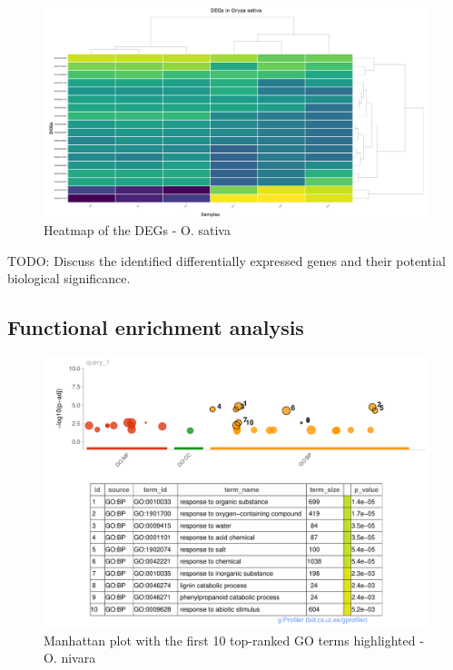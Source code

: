\begin{figure}[htbp]
    \caption{Heatmap of the DEGs - O. sativa}
    \label{fig:4.4-DEG-Heatmap-Oryza_sativa}
    \includegraphics[width=\textwidth]{../../results/plots-and-tables/4.4-DEG-Heatmap-Oryza_sativa}
\end{figure}



TODO: Discuss the identified differentially expressed genes and their potential biological significance.

\subsection{Functional enrichment analysis}



\begin{figure}[htbp]
    \caption{Manhattan plot with the first 10 top-ranked GO terms highlighted - O. nivara}
    \label{fig:5.2-Gost-Plot-Oryza_nivara}
    \includegraphics[width=\textwidth]{../../results/plots-and-tables/5.2-Gost-Plot-Oryza_nivara}
\end{figure}

